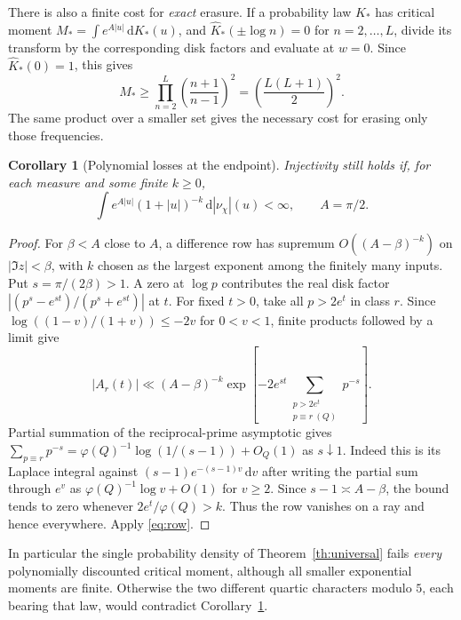 \documentclass[11pt]{article}
\newtheorem{corollary}[theorem]{Corollary}
\newcommand{\dd}{\,\mathrm d}
\begin{document}
There is also a finite cost for \emph{exact} erasure. If a probability law \(K_*\)
has critical moment \(M_*=\int e^{A|u|}\dd K_*(u)\), and
\(\widehat K_*(\pm\log n)=0\) for \(n=2,\ldots,L\), divide its transform by the corresponding disk factors and evaluate at \(w=0\). Since \(\widehat K_*(0)=1\), this gives
\[
   M_*\ge\prod_{n=2}^{L}\left(\frac{n+1}{n-1}\right)^2
       =\left(\frac{L(L+1)}2\right)^2 .
\]
The same product over a smaller set gives the necessary cost for erasing only those frequencies.

\begin{corollary}[Polynomial losses at the endpoint]\label{cor:end}
Injectivity still holds if, for each measure and some finite \(k\ge0\),
\[
       \int e^{A|u|}(1+|u|)^{-k}\dd|\nu_\chi|(u)<\infty,\qquad A=\pi/2.
\]
\end{corollary}
\begin{proof}
For \(\beta<A\) close to \(A\), a difference row has supremum \(O((A-\beta)^{-k})\) on \(|\Im z|<\beta\), with \(k\) chosen as the largest exponent among the finitely many inputs. Put \(s=\pi/(2\beta)>1\). A zero at \(\log p\) contributes the real disk factor \(|(p^s-e^{st})/(p^s+e^{st})|\) at \(t\). For fixed \(t>0\), take all \(p>2e^t\) in class \(r\). Since \(\log((1-v)/(1+v))\le-2v\) for \(0<v<1\), finite products followed by a limit give
\[
 |A_r(t)|\ll (A-\beta)^{-k}
       \exp\!\left[-2e^{st}\sum_{\substack{p>2e^t\\p\equiv r\ (Q)}}p^{-s}\right].
\]
Partial summation of the reciprocal-prime asymptotic gives
\(\sum_{p\equiv r}p^{-s}=\varphi(Q)^{-1}\log(1/(s-1))+O_Q(1)\) as \(s\downarrow1\). Indeed this is its Laplace integral against
\((s-1)e^{-(s-1)v}\dd v\) after writing the partial sum through \(e^v\) as
\(\varphi(Q)^{-1}\log v+O(1)\) for \(v\ge2\).
Since \(s-1\asymp A-\beta\), the bound tends to zero whenever \(2e^t/\varphi(Q)>k\). Thus the row vanishes on a ray and hence everywhere. Apply \eqref{eq:row}.
\end{proof}
In particular the single probability density of Theorem~\ref{th:universal} fails \emph{every} polynomially discounted critical moment, although all smaller exponential moments are finite. Otherwise the two different quartic characters modulo \(5\), each bearing that law, would contradict Corollary~\ref{cor:end}.
\end{document}
